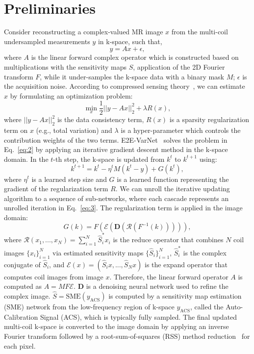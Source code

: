 \documentclass[runningheads]{llncs}
\begin{document}
 


\section{Preliminaries}
Consider  reconstructing a complex-valued MR image $x$ from the multi-coil undersampled measurements $y$ in k-space, such that,
\begin{equation}
\label{eq:1}
y=Ax+\epsilon,
\end{equation}
where $A$ is the linear forward complex operator which is constructed based on multiplications with the sensitivity maps $S$, application of the 2D Fourier transform $F$, while it under-samples the k-space data with a binary mask $M$; $\epsilon$ is the acquisition noise. 
According to compressed sensing theory~\cite{donoho2006compressed}, we can estimate $x$ by formulating an optimization problem:
\begin{equation}
\label{eq:2}
\min_x{\frac{1}{2}||y-Ax||_2^2+\lambda R(x)},
\end{equation}
where $||y-Ax||_2^2$ is the data consistency term, $R(x)$ is a sparsity regularization term on $x$ (e.g., total variation) and $\lambda$ is a hyper-parameter which controls the contribution weights of the two terms.
E2E-VarNet~\cite{sriram2020end} solves the problem in Eq.~\ref{eq:2} by applying an iterative gradient descent method in the k-space domain. In the $t$-th step, the k-space is updated from $k^t$ to $k^{t+1}$ using:
\begin{equation}
\label{eq:3}
k^{t+1}=k^t-\eta^tM(k^t-y)+G(k^t),
\end{equation}
where $\eta^t$ is a learned step size and $G$ is a learned function representing the gradient of the regularization term $R$. We can unroll the iterative updating algorithm to a sequence of sub-networks, where each cascade represents an unrolled iteration in Eq.~\ref{eq:3}. 
The regularization term is applied in the image domain:
\begin{equation}
\label{eq:4}
G(k) = F(\mathcal{E}(\mathbf{D}(\mathcal{R}(F^{-1}(k))))),
\end{equation}
where $\mathcal{R}(x_1,...,x_N)=\sum_{i=1}^N \hat{S}_i^*x_i$ is the reduce operator that combines $N$ coil images $\{x_i\}_{i=1}^N$ via estimated sensitivity maps $\{\hat{S}_i\}_{i=1}^N$, $\hat{S}_i^*$ is the complex conjugate of $\hat{S}_i$, and $\mathcal{E}(x)=(\hat{S}_ix,...,\hat{S}_Nx) $ is the expand operator that computes coil images from image $x$. Therefore, the linear forward operator $A$ is computed as $A=MF\mathcal{E}$. $\mathbf{D}$ is a denoising neural network used to refine the complex image. $\hat{S}=\text{SME}(y_\text{ACS})$ is computed by a sensitivity map estimation (SME) network from the low-frequency region of k-space $y_\text{ACS}$, called the Auto-Calibration Signal (ACS), which is typically fully sampled. The final updated multi-coil k-space is converted to the image domain by applying an inverse Fourier transform followed by a root-sum-of-squares (RSS) method reduction~\cite{roemer1990nmr} for each pixel.
\end{document}
